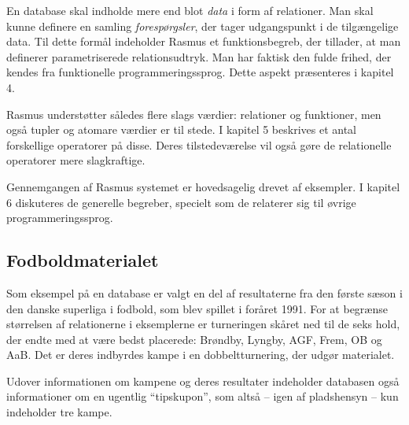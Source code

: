 \documentclass{article}
\newcounter{eks}
\begin{document}
En database skal indholde mere end blot {\em data\/} i form af relationer.
Man skal kunne definere en samling {\em foresp\o{}rgsler},
der tager udgangspunkt i de tilg\ae{}ngelige data. Til dette 
form\aa{}l indeholder {\sc Rasmus} et funktionsbegreb, der
tillader, at man definerer parametriserede relationsudtryk.
Man har faktisk den fulde frihed, der kendes fra funktionelle
programmeringssprog. Dette aspekt pr\ae{}senteres i kapitel 4.

{\sc Rasmus} underst\o{}tter s\aa{}ledes flere slags v\ae{}rdier:
relationer og funktioner, men ogs\aa{} tupler og atomare
v\ae{}rdier er til stede. I kapitel 5 beskrives et antal forskellige
operatorer p\aa{} disse. Deres tilstedev\ae{}relse vil ogs\aa{}
g\o{}re de relationelle operatorer mere slagkraftige.

Gennemgangen af {\sc Rasmus} systemet er hovedsagelig 
drevet af eksempler. I kapitel 6 diskuteres de
generelle begreber, specielt som de relaterer sig til
\o{}vrige programmeringssprog.

\subsection{Fodboldmaterialet}
Som eksempel p\aa{} en database er valgt en del af resultaterne fra den f\o{}rste
s\ae{}son i den danske superliga i fodbold, som blev spillet i for\aa{}ret 1991.
For at begr\ae{}nse st\o{}rrelsen af relationerne i eksemplerne er
turneringen sk\aa{}ret ned til de seks hold, der endte med at v\ae{}re
bedst placerede: Br\o{}ndby, Lyngby, AGF, Frem, OB og AaB. Det er deres
indbyrdes kampe i en dobbeltturnering, der udg\o{}r materialet.

Udover informationen om kampene og deres resultater indeholder data\-bas\-en
ogs\aa{} informationer om en ugentlig ``tipskupon'', som alts\aa{} -- igen
af plads\-hensyn -- kun indeholder tre kampe.
\end{document}
